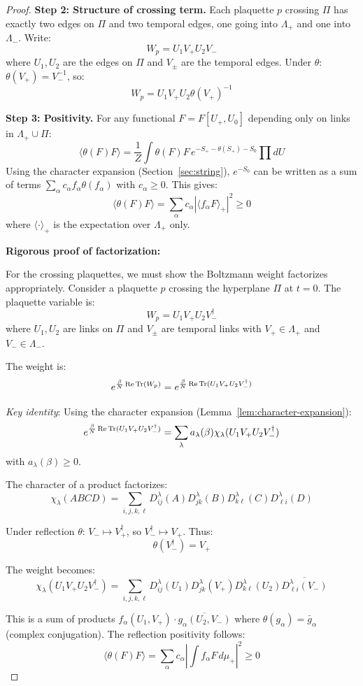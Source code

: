 \begin{proof}
\textbf{Step 2: Structure of crossing term.}
Each plaquette $p$ crossing $\Pi$ has exactly two edges on $\Pi$ and two 
temporal edges, one going into $\Lambda_+$ and one into $\Lambda_-$. Write:
\[
W_p = U_1 V_+ U_2 V_-
\]
where $U_1, U_2$ are the edges on $\Pi$ and $V_\pm$ are the temporal edges.
Under $\theta$: $\theta(V_+) = V_-^{-1}$, so:
\[
W_p = U_1 V_+ U_2 \theta(V_+)^{-1}
\]

\textbf{Step 3: Positivity.}
For any functional $F = F[U_+, U_0]$ depending only on links in $\Lambda_+ \cup \Pi$:
\[
\langle \theta(F) F \rangle = \frac{1}{Z} \int \theta(F) F \, e^{-S_+ - \theta(S_+) - S_0} \prod dU
\]
Using the character expansion (Section~\ref{sec:string}), $e^{-S_0}$ can be 
written as a sum of terms $\sum_\alpha c_\alpha f_\alpha \theta(f_\alpha)$ 
with $c_\alpha \geq 0$. This gives:
\[
\langle \theta(F) F \rangle = \sum_\alpha c_\alpha |\langle f_\alpha F \rangle_+|^2 \geq 0
\]
where $\langle \cdot \rangle_+$ is the expectation over $\Lambda_+$ only.

\textbf{Rigorous proof of factorization:}

For the crossing plaquettes, we must show the Boltzmann weight factorizes 
appropriately. Consider a plaquette $p$ crossing the hyperplane $\Pi$ at $t = 0$.
The plaquette variable is:
\[
W_p = U_1 V_+ U_2 V_-^\dagger
\]
where $U_1, U_2$ are links on $\Pi$ and $V_\pm$ are temporal links with 
$V_+ \in \Lambda_+$ and $V_- \in \Lambda_-$.

The weight is:
\[
e^{\frac{\beta}{N}\operatorname{Re}\operatorname{Tr}(W_p)} = e^{\frac{\beta}{N}\operatorname{Re}\operatorname{Tr}(U_1 V_+ U_2 V_-^\dagger)}
\]

\textit{Key identity}: Using the character expansion (Lemma~\ref{lem:character-expansion}):
\[
e^{\frac{\beta}{N}\operatorname{Re}\operatorname{Tr}(U_1 V_+ U_2 V_-^\dagger)} = \sum_\lambda a_\lambda(\beta) \chi_\lambda(U_1 V_+ U_2 V_-^\dagger)
\]
with $a_\lambda(\beta) \geq 0$.

The character of a product factorizes:
\[
\chi_\lambda(ABCD) = \sum_{i,j,k,\ell} D^\lambda_{ij}(A) D^\lambda_{jk}(B) D^\lambda_{k\ell}(C) D^\lambda_{\ell i}(D)
\]

Under reflection $\theta$: $V_- \mapsto V_+^\dagger$, so $V_-^\dagger \mapsto V_+$. Thus:
\[
\theta(V_-^\dagger) = V_+
\]

The weight becomes:
\[
\chi_\lambda(U_1 V_+ U_2 V_-^\dagger) = \sum_{i,j,k,\ell} D^\lambda_{ij}(U_1) D^\lambda_{jk}(V_+) D^\lambda_{k\ell}(U_2) \overline{D^\lambda_{\ell i}(V_-)}
\]

This is a sum of products $f_\alpha(U_1, V_+) \cdot \overline{g_\alpha(U_2, V_-)}$ 
where $\theta(g_\alpha) = \bar{g}_\alpha$ (complex conjugation). The reflection 
positivity follows:
\[
\langle \theta(F) F \rangle = \sum_\alpha c_\alpha \left|\int f_\alpha F \, d\mu_+\right|^2 \geq 0
\]
\end{proof}

